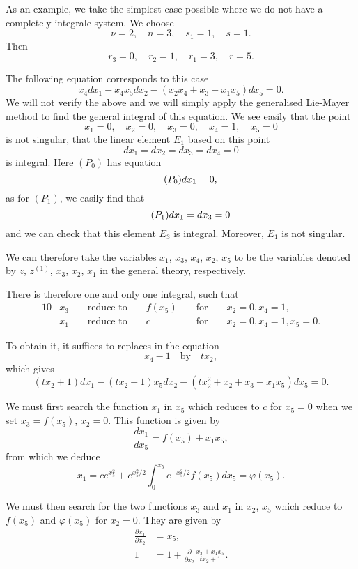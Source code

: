 \documentclass[leqno,11pt]{book}
\makeatletter
\newcommand{\pd}{\partial}
\theoremstyle{shape1}
\theoremstyle{shapesmall}
\let\old@phi\phi
\let\old@varphi\varphi
\let\phi\old@varphi
\let\varphi\old@phi
\makeatother
\begin{document}
As an example, we take the simplest case possible where we do not have a completely integrale system. We choose
\[
\nu=2,\quad n=3,\quad s_{1}=1,\quad s=1.
\]
Then
\[
r_{3}=0,\quad r_{2}=1,\quad r_{1}=3,\quad r=5.
\]

The following equation corresponds to this case
\[
x_{4}dx_{1}-x_{4}x_{5}dx_{2}-(x_{2}x_{4}+x_{3}+x_{1}x_{5})dx_{5}=0.
\]
We will not verify the above and we will simply apply the generalised Lie-Mayer method to find the general integral of this equation. We see easily that the point
\[
x_{1}=0,\quad x_{2}=0,\quad x_{3}=0,\quad x_{4}=1,\quad x_{5}=0
\]
is not singular, that the linear element $E_{1}$ based on this point
\[
dx_{1}=dx_{2}=dx_{3}=dx_{4}=0
\]
is integral. Here $(P_{0})$ has equation
\begin{equation}
  \tag{$P_{0}$}
  dx_{1}=0,
\end{equation}
as for $(P_{1})$, we easily find that
\begin{equation}
  \tag{$P_{1}$}
  dx_{1}=dx_{3}=0
\end{equation}
and we can check that this element $E_{3}$ is integral. Moreover, $E_{1}$ is not singular.

We can therefore take the variables $x_{1}$, $x_{3}$, $x_{4}$, $x_{2}$, $x_{5}$ to be the variables denoted by $z$, $z^{(1)}$, $x_{3}$, $x_{2}$, $x_{1}$ in the general theory, respectively.

There is therefore one and only one integral, such that
\begin{alignat*}{10}
  &x_{3}&&\text{ reduce to }&&f(x_{5})&&\text{ for }&&x_{2}=0,x_{4}=1,\\
  &x_{1}&&\text{ reduce to }&&c&&\text{ for }&&x_{2}=0,x_{4}=1,x_{5}=0.
\end{alignat*}

To obtain it, it suffices to replaces in the equation
\[
x_{4}-1\quad\text{by}\quad tx_{2},
\]
which gives
\[
(tx_{2}+1)dx_{1}-(tx_{2}+1)x_{5}dx_{2}-(tx^{2}_{2}+x_{2}+x_{3}+x_{1}x_{5})dx_{5}=0.
\]

We must first search the function $x_{1}$ in $x_{5}$ which reduces to $c$ for $x_{5}=0$ when we set $x_{3}=f(x_{5})$, $x_{2}=0$. This function is given by
\[
\frac{dx_{1}}{dx_{5}}=f(x_{5})+x_{1}x_{5},
\]
from which we deduce
\[
x_{1}=ce^{x_{5}^{2}}+e^{x^{2}_{5}/2}\int_{0}^{x_{5}}e^{-x_{5}^{2}/2}f(x_{5})dx_{5}=\phi(x_{5}).
\]

We must then search for the two functions $x_{3}$ and $x_{1}$ in $x_{2}$, $x_{5}$ which reduce to $f(x_{5})$ and $\phi(x_{5})$ for $x_{2}=0$. They are given by
\begin{align*}
  \frac{\pd x_{1}}{\pd x_{2}}&=x_{5},\\
  1&=1+\frac{\pd}{\pd x_{2}}\frac{x_{3}+x_{1}x_{5}}{tx_{2}+1}.
\end{align*}
\end{document}
